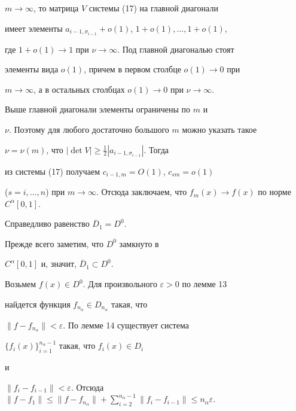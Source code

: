 \begin{pf}
$m\to\infty$, то матрица $V$ системы (17) на главной диагонали


имеет элементы $a_{i-1,\sigma_{i-1}}+o(1)$, $1+o(1),\dotsc,1+o(1)$,


где $1+o(1)\to1$ при $\nu\to\infty$. Под главной диагональю стоят


элементы вида $o(1)$, причем в первом столбце $o(1)\to 0$ при


$m\to\infty$, а в остальных столбцах $o(1)\to0$ при $\nu\to\infty$.


Выше главной диагонали элементы ограничены по $m$ и


$\nu$. Поэтому для любого достаточно большого $m$ можно указать такое


$\nu=\nu(m)$, что $|\det V|\ge \frac12|a_{i-1,\sigma_{i-1}}|$. Тогда


из системы (17) получаем $c_{i-1,m}=O(1)$, $c_{sm}=o(1)$


($s=i,\dotsc,n$) при $m\to\infty$. Отсюда заключаем, что $f_{m}(x)\to


f(x)$ по норме $C^\alpha[0,1]$.


\end{pf}





\begin{thm}


Справедливо равенство $\overline D_1=D^0$.


\end{thm}





\begin{pf}


Прежде всего заметим, что $D^0$ замкнуто в


$C^\alpha[0,1]$ и, значит, $\overline D_1\subset D^0$.


Возьмем $f(x)\in D^0$. Для произвольного $\varepsilon>0$ по лемме 13


найдется функция $f_{n_\alpha}\in D_{n_\alpha}$ такая, что


$\|f-f_{n_\alpha}\|<\varepsilon$. По лемме 14 существует система


$\{f_i(x)\}_{i=1}^{n_\alpha-1}$ такая, что $f_i(x)\in D_i$


и \linebreak


$\|f_i-f_{i-1}\|<\varepsilon$. Отсюда $\|f-f_1\|\le\|f-f_{n_\alpha}\|+


\sum\limits_{i=2}^{n_\alpha-1}\|f_i-f_{i-1}\|\le n_\alpha\varepsilon$.


\end{pf}





